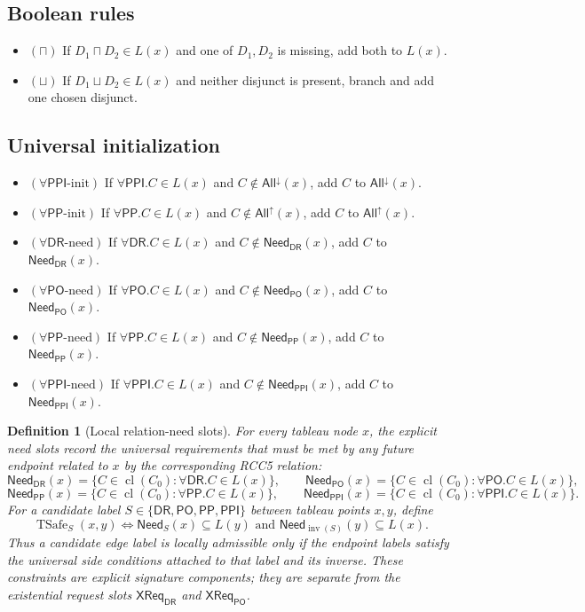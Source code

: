 \documentclass[11pt]{article}
\newtheorem{definition}{Definition}[section]
\theoremstyle{remark}
\newcommand{\DR}{\mathsf{DR}}
\newcommand{\PO}{\mathsf{PO}}
\newcommand{\PP}{\mathsf{PP}}
\newcommand{\PPI}{\mathsf{PPI}}
\newcommand{\cl}{\operatorname{cl}}
\newcommand{\AllUp}{\mathsf{All}^{\uparrow}}
\newcommand{\AllDown}{\mathsf{All}^{\downarrow}}
\newcommand{\CrossDR}{\mathsf{XReq}_{\DR}}
\newcommand{\CrossPO}{\mathsf{XReq}_{\PO}}
\newcommand{\NeedDR}{\mathsf{Need}_{\DR}}
\newcommand{\NeedPO}{\mathsf{Need}_{\PO}}
\newcommand{\NeedPP}{\mathsf{Need}_{\PP}}
\newcommand{\NeedPPI}{\mathsf{Need}_{\PPI}}
\newcommand{\TSafe}{\operatorname{TSafe}}
\newcommand{\inv}{\operatorname{inv}}
\begin{document}
\subsection{Boolean rules}

\begin{itemize}
    \item $(\sqcap)$ If $D_1\sqcap D_2\in L(x)$ and one of $D_1,D_2$ is missing, add both to $L(x)$.
    \item $(\sqcup)$ If $D_1\sqcup D_2\in L(x)$ and neither disjunct is present, branch and add one chosen disjunct.
\end{itemize}

\subsection{Universal initialization}

\begin{itemize}
    \item $(\forall\PPI\text{-init})$ If $\forall\PPI.C\in L(x)$ and $C\notin \AllDown(x)$, add $C$ to $\AllDown(x)$.
    \item $(\forall\PP\text{-init})$ If $\forall\PP.C\in L(x)$ and $C\notin \AllUp(x)$, add $C$ to $\AllUp(x)$.
    \item $(\forall\DR\text{-need})$ If $\forall\DR.C\in L(x)$ and $C\notin \NeedDR(x)$, add $C$ to $\NeedDR(x)$.
    \item $(\forall\PO\text{-need})$ If $\forall\PO.C\in L(x)$ and $C\notin \NeedPO(x)$, add $C$ to $\NeedPO(x)$.
    \item $(\forall\PP\text{-need})$ If $\forall\PP.C\in L(x)$ and $C\notin \NeedPP(x)$, add $C$ to $\NeedPP(x)$.
    \item $(\forall\PPI\text{-need})$ If $\forall\PPI.C\in L(x)$ and $C\notin \NeedPPI(x)$, add $C$ to $\NeedPPI(x)$.
\end{itemize}

\begin{definition}[Local relation-need slots]
For every tableau node $x$, the explicit need slots record the universal requirements that must be met by any future endpoint related to $x$ by the corresponding RCC5 relation:
\[
\NeedDR(x)=\{C\in\cl(C_0): \forall\DR.C\in L(x)\},\qquad
\NeedPO(x)=\{C\in\cl(C_0): \forall\PO.C\in L(x)\},
\]
\[
\NeedPP(x)=\{C\in\cl(C_0): \forall\PP.C\in L(x)\},\qquad
\NeedPPI(x)=\{C\in\cl(C_0): \forall\PPI.C\in L(x)\}.
\]
For a candidate label $S\in\{\DR,\PO,\PP,\PPI\}$ between tableau points $x,y$, define
\[
\TSafe_S(x,y)\iff \mathsf{Need}_{S}(x)\subseteq L(y)\text{ and }\mathsf{Need}_{\inv(S)}(y)\subseteq L(x).
\]
Thus a candidate edge label is locally admissible only if the endpoint labels satisfy the universal side conditions attached to that label and its inverse. These constraints are explicit signature components; they are separate from the existential request slots $\CrossDR$ and $\CrossPO$.
\end{definition}
\end{document}
